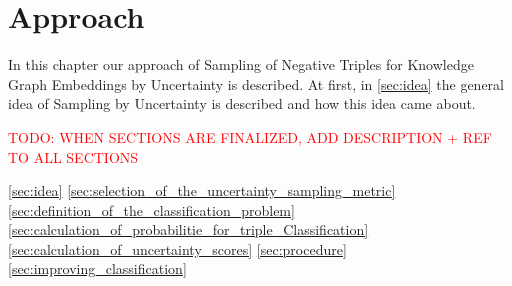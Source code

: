 \chapter{Approach}
\label{ch:approach}

In this chapter our approach of Sampling of Negative Triples for Knowledge Graph Embeddings by Uncertainty is described.
At first, in \autoref{sec:idea} the general idea of Sampling by Uncertainty is described and how this idea came about.

\textcolor{red}{TODO: WHEN SECTIONS ARE FINALIZED, ADD DESCRIPTION + REF TO ALL SECTIONS}

\autoref{sec:idea}
\autoref{sec:selection_of_the_uncertainty_sampling_metric}
\autoref{sec:definition_of_the_classification_problem}
\autoref{sec:calculation_of_probabilitie_for_triple_Classification}
\autoref{sec:calculation_of_uncertainty_scores}
\autoref{sec:procedure}
\autoref{sec:improving_classification}













